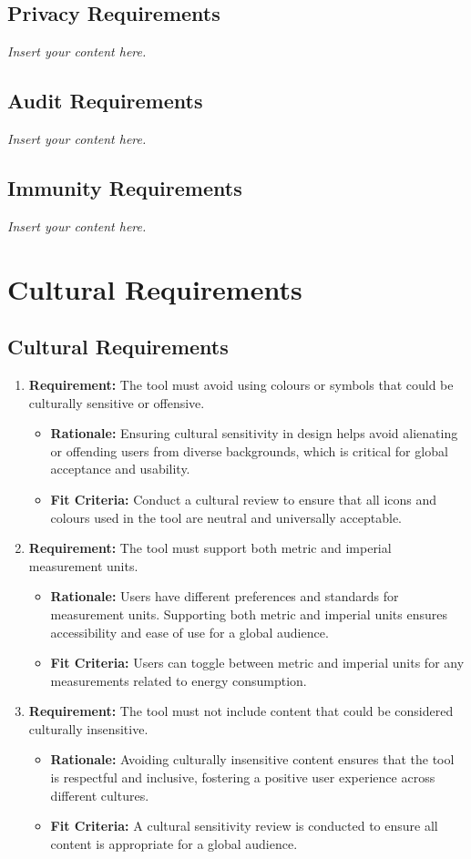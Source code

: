 \documentclass[12pt]{article}
\newcommand{\lips}{\textit{Insert your content here.}}
\begin{document}
\subsection{Privacy Requirements}
\lips
\subsection{Audit Requirements}
\lips
\subsection{Immunity Requirements}
\lips

\section{Cultural Requirements}
\subsection{Cultural Requirements}
\begin{enumerate}
  \item \textbf{Requirement:} The tool must avoid using colours or symbols that could be culturally sensitive or offensive.
  \begin{itemize}
      \item \textbf{Rationale:}  Ensuring cultural sensitivity in design helps avoid alienating or offending users from diverse backgrounds, which is critical for global acceptance and usability.
      \item \textbf{Fit Criteria:} Conduct a cultural review to ensure that all icons and colours used in the tool are neutral and universally acceptable.
  \end{itemize}
  
  \item \textbf{Requirement:} The tool must support both metric and imperial measurement units.
  \begin{itemize}
      \item \textbf{Rationale:} Users have different preferences and standards for measurement units. Supporting both metric and imperial units ensures accessibility and ease of use for a global audience.
      \item \textbf{Fit Criteria:} Users can toggle between metric and imperial units for any measurements related to energy consumption.
  \end{itemize}   
  
  \item \textbf{Requirement:} The tool must not include content that could be considered culturally insensitive.
  \begin{itemize}
      \item \textbf{Rationale:} Avoiding culturally insensitive content ensures that the tool is respectful and inclusive, fostering a positive user experience across different cultures.
      \item \textbf{Fit Criteria:} A cultural sensitivity review is conducted to ensure all content is appropriate for a global audience.
  \end{itemize}

\end{enumerate}
\end{document}
